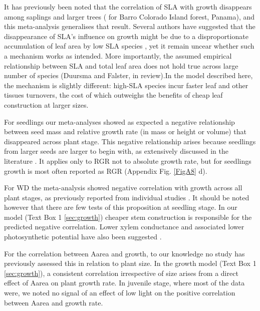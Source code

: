 \documentclass[a4paper]{article}\usepackage[]{graphicx}\usepackage[]{color}
\begin{document}
It has previously been noted that the correlation of SLA with growth disappears among saplings and larger trees (\citealt{Wright:2010tp} for Barro Colorado Island forest, Panama), and this meta-analysis generalises that result. Several authors have suggested that the disappearance of SLA's influence on growth might be due to a disproportionate accumulation of leaf area by low SLA species \citep{Reich:1992wm,Poorter:2008iu,Wright:2010tp}, yet it remain uncear whether such a mechanism works as intended. More importantly, the assumed empirical relationship between SLA and total leaf area does not hold true across large number of species (Duursma and Falster, in review).In the model described here, the mechanism is slightly different: high-SLA species incur faster leaf and other tissues turnovers, the cost of which outweighs the benefits of cheap leaf construction at larger sizes.

For seedlings our meta-analyses showed as expected a negative relationship between seed mass and relative growth rate (in mass or height or volume) that disappeared across plant stage. This negative relationship arises because seedlings from larger seeds are larger to begin with, as extensively discussed in the literature \citep[reviewed by][]{Turnbull:2012ew}. It applies only to RGR not to absolute growth rate, but for seedlings growth is most often reported as RGR (Appendix Fig. \ref{FigA8} d).

For WD the meta-analysis showed negative correlation with growth across all plant stages, as previously reported from individual studies \citep{Wright:2010tp,Ruger:2012jv}. It should be noted however that there are few tests of this proposition at seedling stage. In our model (Text Box 1 \ref{sec:growth}) cheaper stem construction is responsible for the predicted negative correlation. Lower xylem conductance and associated lower photosynthetic potential have also been suggested \citep[reviewed by][]{Chave:2009iy}. 

For the correlation between Aarea and growth, to our knowledge no study has previously assessed this in relation to plant size. In the growth model (Text Box 1 \ref{sec:growth}), a consistent correlation irrespective of size arises from a direct effect of Aarea on plant growth rate. In juvenile stage, where most of the data were, we noted no signal of an effect of low light on the positive correlation between Aarea and growth rate.
\end{document}
